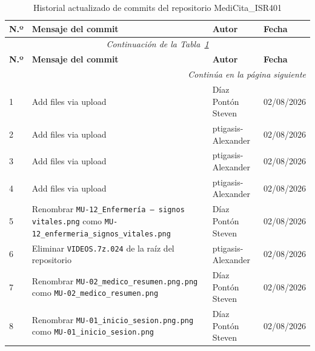 \documentclass[11pt,a4paper]{article}
\begin{document}
	\begin{longtable}{
			p{}
			p{}
			p{}
			p{}
		}
		\caption{Historial actualizado de commits del repositorio MediCita\_ISR401}
		\label{tab:commits-reales}\\
		
		\toprule
		\textbf{N.º} &
		\textbf{Mensaje del commit} &
		\textbf{Autor} &
		\textbf{Fecha} \\
		\midrule
		\endfirsthead
		
		\multicolumn{4}{c}{\textit{Continuación de la Tabla~\ref{tab:commits-reales}}}\\
		\toprule
		\textbf{N.º} &
		\textbf{Mensaje del commit} &
		\textbf{Autor} &
		\textbf{Fecha} \\
		\midrule
		\endhead
		
		\midrule
		\multicolumn{4}{r}{\textit{Continúa en la página siguiente}}\\
		\endfoot
		
		\bottomrule
		\endlastfoot
		
		1 &
		Add files via upload &
		Díaz Pontón Steven &
		02/08/2026 \\
		
		2 &
		Add files via upload &
		ptigasis-Alexander &
		02/08/2026 \\
		
		3 &
		Add files via upload &
		ptigasis-Alexander &
		02/08/2026 \\
		
		4 &
		Add files via upload &
		ptigasis-Alexander &
		02/08/2026 \\
		
		5 &
		Renombrar \texttt{MU-12\_Enfermería — signos vitales.png} como
		\texttt{MU-12\_enfermeria\_signos\_vitales.png} &
		Díaz Pontón Steven &
		02/08/2026 \\
		
		6 &
		Eliminar \texttt{VIDEOS.7z.024} de la raíz del repositorio &
		ptigasis-Alexander &
		02/08/2026 \\
		
		7 &
		Renombrar \texttt{MU-02\_medico\_resumen.png.png} como
		\texttt{MU-02\_medico\_resumen.png} &
		Díaz Pontón Steven &
		02/08/2026 \\
		
		8 &
		Renombrar \texttt{MU-01\_inicio\_sesion.png.png} como
		\texttt{MU-01\_inicio\_sesion.png} &
		Díaz Pontón Steven &
		02/08/2026 \\
		

\end{longtable}
\end{document}
